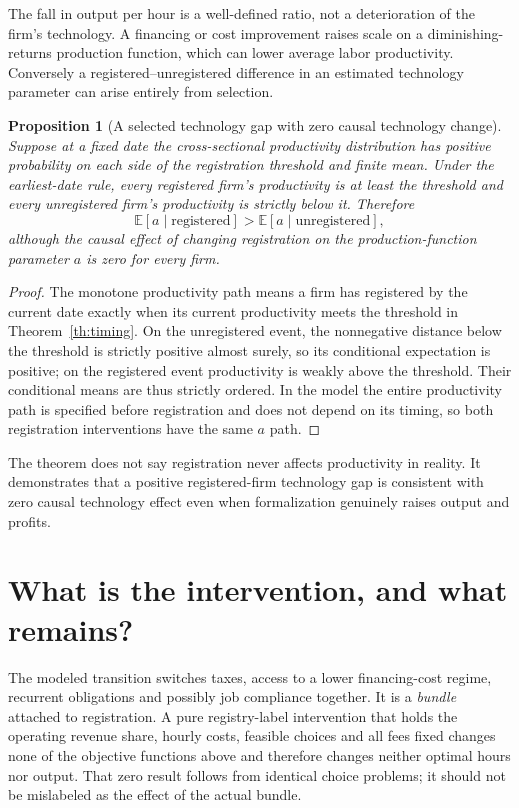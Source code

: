 \documentclass[11pt,a4paper]{article}
\newtheorem{proposition}[theorem]{Proposition}
\theoremstyle{definition}
\theoremstyle{remark}
\newcommand{\E}{\mathbb E}
\begin{document}
The fall in output per hour is a well-defined ratio, not a deterioration of the firm's technology. A financing or cost improvement raises scale on a diminishing-returns production function, which can lower average labor productivity. Conversely a registered--unregistered difference in an estimated technology parameter can arise entirely from selection.

\begin{proposition}[A selected technology gap with zero causal technology change]\label{pr:selection}
Suppose at a fixed date the cross-sectional productivity distribution has positive probability on each side of the registration threshold and finite mean. Under the earliest-date rule, every registered firm's productivity is at least the threshold and every unregistered firm's productivity is strictly below it. Therefore
\[
 \E[a\mid\text{registered}]>\E[a\mid\text{unregistered}],
\]
although the causal effect of changing registration on the production-function parameter $a$ is zero for every firm.
\end{proposition}
\begin{proof}
The monotone productivity path means a firm has registered by the current date exactly when its current productivity meets the threshold in Theorem~\ref{th:timing}. On the unregistered event, the nonnegative distance below the threshold is strictly positive almost surely, so its conditional expectation is positive; on the registered event productivity is weakly above the threshold. Their conditional means are thus strictly ordered. In the model the entire productivity path is specified before registration and does not depend on its timing, so both registration interventions have the same $a$ path.
\end{proof}

The theorem does not say registration never affects productivity in reality. It demonstrates that a positive registered-firm technology gap is consistent with zero causal technology effect even when formalization genuinely raises output and profits.

\section{What is the intervention, and what remains?}
The modeled transition switches taxes, access to a lower financing-cost regime, recurrent obligations and possibly job compliance together. It is a \emph{bundle} attached to registration. A pure registry-label intervention that holds the operating revenue share, hourly costs, feasible choices and all fees fixed changes none of the objective functions above and therefore changes neither optimal hours nor output. That zero result follows from identical choice problems; it should not be mislabeled as the effect of the actual bundle.
\end{document}
